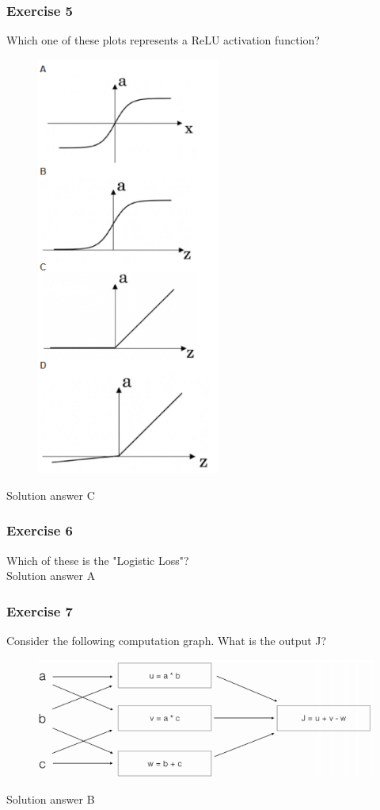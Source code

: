 \subsubsection*{Exercise 5}
Which one of these plots represents a ReLU activation function?
\begin{figure}[htbp]
    \centering
    \includegraphics[width=6cm]{ExerciseBook/01-NeuralNetwork/exercise5.png}\newline
\end{figure}
Solution answer C
\subsubsection*{Exercise 6}
Which of these is the "Logistic Loss"?\\
Solution answer A
\subsubsection*{Exercise 7}
Consider the following computation graph. What is the output J?
\begin{figure}[htbp]
    \centering
    \includegraphics[width=12cm]{ExerciseBook/01-NeuralNetwork/exercise7.png}\newline
\end{figure}
Solution answer B
